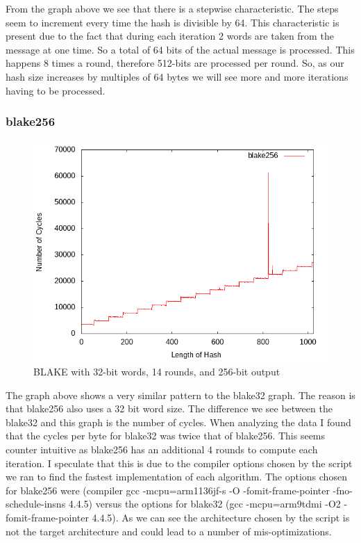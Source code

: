 \documentclass[10pt,a4paper]{article}
\begin{document}
From the graph above we see that there is a stepwise characteristic. The steps seem to increment every time the hash is divisible by 64. 
This characteristic is present due to the fact that during each iteration 2 words are taken from the message at one time. So a total of 64 bits
of the actual message is processed. This happens 8 times a round, therefore 512-bits are processed per round. So, as our hash size increases by 
multiples of 64 bytes we will see more and more iterations having to be processed.

\subsubsection{blake256}
    \begin{figure}[H]
        \begin{center}
            \includegraphics[scale=0.5]{images_fast_run/blake256.png} 
            \caption{BLAKE with 32-bit words, 14 rounds, and 256-bit output}
        \end{center}
    \end{figure}

The graph above shows a very similar pattern to the blake32 graph. The reason is that blake256 also uses a 32 bit word size. The difference we
see between the blake32 and this graph is the number of cycles. When analyzing the data I found that the cycles per byte for blake32 was twice
that of blake256. This seems counter intuitive as blake256 has an additional 4 rounds to compute each iteration. I speculate that this is
due to the compiler options chosen by the script we ran to find the fastest implementation of each algorithm. The options chosen for blake256 were 
(compiler gcc -mcpu=arm1136jf-s -O -fomit-frame-pointer -fno-schedule-insns 4.4.5) versus the options for blake32 
(gcc -mcpu=arm9tdmi -O2 -fomit-frame-pointer 4.4.5). As we can see the architecture chosen by the script is not the target architecture and could
lead to a number of mis-optimizations. 
\end{document}
